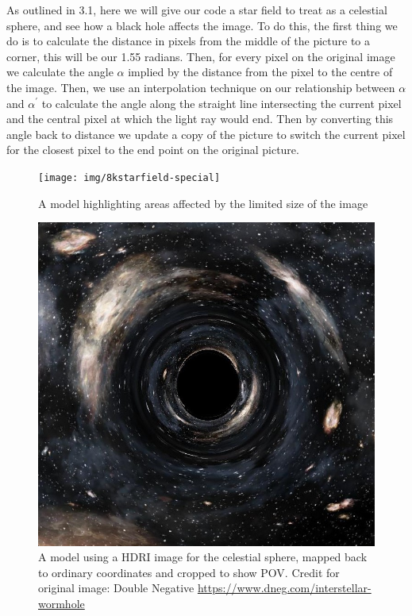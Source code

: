 \documentclass[oneside,openright,frontopenright]{dmathesis}
\begin{document}
	As outlined in 3.1, here we will give our code a star field to treat as a celestial sphere, and see how a black hole affects the image. To do this, the first thing we do is to calculate the distance in pixels from the middle of the picture to a corner, this will be our 1.55 radians. Then, for every pixel on the original image we calculate the angle $\alpha$ implied by the distance from the pixel to the centre of the image. Then, we use an interpolation technique on our relationship between $\alpha$ and $\alpha^{'}$ to calculate the angle along the straight line intersecting the current pixel and the central pixel at which the light ray would end. Then by converting this angle back to distance we update a copy of the picture to switch the current pixel for the closest pixel to the end point on the original picture.

\begin{figure}
	\centering
	\begin{minipage}[b]{0.6\textwidth}
		\texttt{[image: img/8kstarfield-special]}
		\caption{A model highlighting areas affected by the limited size of the image}
	\end{minipage}
\hfill
	\begin{minipage}[b]{0.6\textwidth}
		\includegraphics[width=\textwidth]{img/hdri-pov}
		\caption{A model using a HDRI image for the celestial sphere, mapped back to ordinary coordinates and cropped to show POV. Credit for original image: Double Negative \url{https://www.dneg.com/interstellar-wormhole}}
	\end{minipage}
\end{figure}
\end{document}
